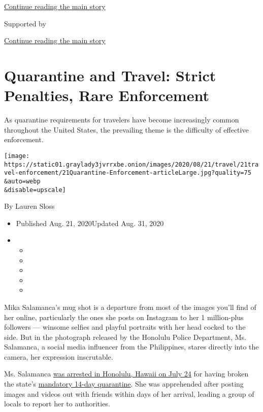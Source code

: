 \protect\hyperlink{after-top}{Continue reading the main story}

Supported by

\protect\hyperlink{after-sponsor}{Continue reading the main story}

\hypertarget{quarantine-and-travel-strict-penalties-rare-enforcement}{%
\section{Quarantine and Travel: Strict Penalties, Rare
Enforcement}\label{quarantine-and-travel-strict-penalties-rare-enforcement}}

As quarantine requirements for travelers have become increasingly common
throughout the United States, the prevailing theme is the difficulty of
effective enforcement.

\texttt{[image: https://static01.graylady3jvrrxbe.onion/images/2020/08/21/travel/21travel-enforcement/21Quarantine-Enforcement-articleLarge.jpg?quality=75\\\&auto=webp\\\&disable=upscale]}

By Lauren Sloss

\begin{itemize}
\item
  Published Aug. 21, 2020Updated Aug. 31, 2020
\item
  \begin{itemize}
  \item
  \item
  \item
  \item
  \item
  \end{itemize}
\end{itemize}

Mika Salamanca's mug shot is a departure from most of the images you'll
find of her online, particularly the ones she posts on Instagram to her
1 million-plus followers --- winsome selfies and playful portraits with
her head cocked to the side. But in the photograph released by the
Honolulu Police Department, Ms. Salamanca, a social media influencer
from the Philippines, stares directly into the camera, her expression
inscrutable.

Ms. Salamanca
\href{https://www.kitv.com/story/42406880/social-media-influencer-apologizes-for-breaking-hawaiis-mandated-14day-quarantine}{was
arrested in Honolulu, Hawaii on July 24} for having broken the state's
\href{https://hidot.hawaii.gov/coronavirus/}{mandatory 14-day
quarantine}. She was apprehended after posting images and videos out
with friends within days of her arrival, leading a group of locals to
report her to authorities.

